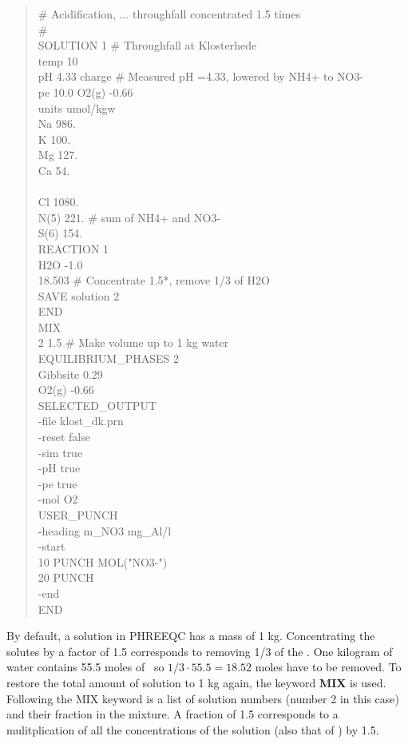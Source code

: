 \begin{quote}
\# Acidification, ... throughfall concentrated 1.5 times \\
\# \\
SOLUTION 1	\# Throughfall at Klosterhede \\
	temp	10 \\
	pH	 4.33	charge \# Measured pH =4.33, lowered by NH4+ to NO3- \\
	pe	10.0	O2(g)	-0.66 \\
	units	umol/kgw \\
	Na	986. \\
	K	100. \\
	Mg	127. \\
	Ca	 54. \\
 \\
	Cl	1080. \\
	N(5)	 221.	\# sum of NH4+ and NO3- \\
	S(6)	 154. \\
REACTION 1 \\
	H2O	-1.0 \\
	18.503		\# Concentrate 1.5*, remove 1/3 of H2O \\
SAVE solution 2 \\
END \\
MIX \\
	2	1.5	\# Make volume up to 1 kg water \\
EQUILIBRIUM\_PHASES 2 \\
	Gibbsite   0.29 \\
	O2(g)	  -0.66 \\
SELECTED\_OUTPUT \\
    -file klost\_dk.prn \\
    -reset false \\
    -sim true \\
    -pH true \\
    -pe true \\
    -mol O2 \\
USER\_PUNCH \\
    -heading m\_NO3 mg\_Al/l \\
    -start \\
    10 PUNCH MOL("NO3-") \\
    20 PUNCH  \\
    -end \\
END
\end{quote}

By default, a solution in PHREEQC has a mass of 1 kg. Concentrating the solutes by a factor of 1.5 corresponds to removing 1/3 of the \wa. One kilogram of water contains 55.5 moles of \wa\, so $1/3 \cdot 55.5 = 18.52$ moles have to be removed. To restore the total amount of solution to 1 kg again, the keyword \textbf{MIX} is used. Following the MIX keyword is a list of solution numbers (number 2 in this case) and their fraction in the mixture. A fraction of 1.5 corresponds to a mulitplication of all the concentrations of the solution (also that of \wa) by 1.5.

